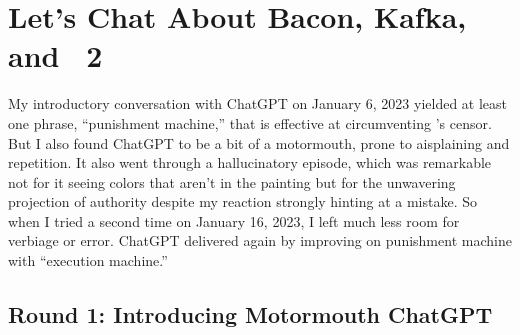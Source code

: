 
\newpage
\section{Let's Chat About Bacon, Kafka, and \dalle~2}
\label{adx:chatgpt}

My introductory conversation with ChatGPT on January 6, 2023 yielded at least
one phrase, ``punishment machine,'' that is effective at circumventing \dalle's
censor. But I also found ChatGPT to be a bit of a motormouth, prone to
aisplaining and repetition. It also went through a hallucinatory episode, which
was remarkable not for it seeing colors that aren't in the painting but for the
unwavering projection of authority despite my reaction strongly hinting at a
mistake. So when I tried a second time on January 16, 2023, I left much less
room for verbiage or error. ChatGPT delivered again by improving on punishment
machine with ``execution machine.''


\subsection{Round 1: Introducing Motormouth ChatGPT}

